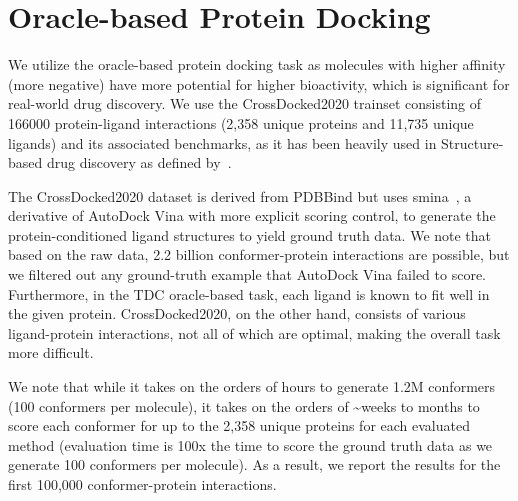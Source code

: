 
\section{Oracle-based Protein Docking}
\label{section:protein}
We utilize the oracle-based protein docking task as molecules with higher affinity (more negative) have more potential for higher bioactivity, which is significant for real-world drug discovery. We use the CrossDocked2020 trainset consisting of 166000 protein-ligand interactions (2,358 unique proteins and 11,735 unique ligands) and its associated benchmarks, as it has been heavily used in Structure-based drug discovery as defined by~\cite{pocket2mol, targetdiff}.

The CrossDocked2020 dataset is derived from PDBBind but uses smina~\citep{smina}, a derivative of AutoDock Vina with more explicit scoring control, to generate the protein-conditioned ligand structures to yield ground truth data. We note that based on the raw data, 2.2 billion conformer-protein interactions are possible, but we filtered out any ground-truth example that AutoDock Vina failed to score. Furthermore, in the TDC oracle-based task, each ligand is known to fit well in the given protein. CrossDocked2020, on the other hand, consists of various ligand-protein interactions, not all of which are optimal, making the overall task more difficult.

We note that while it takes on the orders of hours to generate 1.2M conformers (100 conformers per molecule), it takes on the orders of \textasciitilde{weeks to months} to score each conformer for up to the 2,358 unique proteins for each evaluated method (evaluation time is 100x the time to score the ground truth data as we generate 100 conformers per molecule). As a result, we report the results for the first 100,000 conformer-protein interactions.

